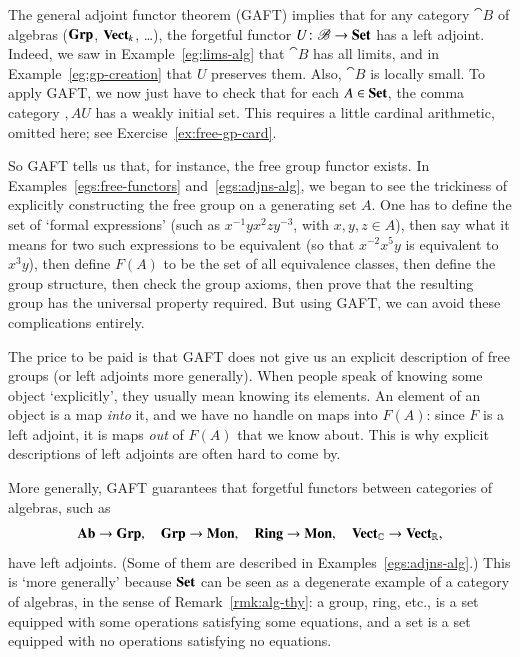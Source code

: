\begin{example}
\label{eg:gaft-free-alg}
The general adjoint functor theorem (GAFT) implies that for any category
$\cat{B}$ of algebras ($\mathbf{Grp}$, $\mathbf{Vect}_k$, \ldots), the forgetful%
%
%
functor $U\from \cat{B} \to \Set$ has a left adjoint.  Indeed, we saw in
Example~\ref{eg:lims-alg} that $\cat{B}$ has all limits, and in
Example~\ref{eg:gp-creation} that $U$ preserves them.  Also, $\cat{B}$ is
locally small.  To apply GAFT, we now just have to check that for each $A
\in \mathbf{Set}$, the comma category $\comma{A}{U}$ has a weakly initial set.
This requires a little cardinal%
%
%
%
arithmetic, omitted here; see Exercise~\ref{ex:free-gp-card}.

So GAFT tells us that, for instance, the free group%
%
%
functor exists.  In Examples~\ref{egs:free-functors}
and~\ref{egs:adjns-alg}, we began to see the
trickiness of explicitly constructing the free group on a generating set
$A$.  One has to define the set of `formal expressions' (such as $x^{-1} y
x^2 z y^{-3}$, with $x, y, z \in A$), then say what it means for two such
expressions to be equivalent (so that $x^{-2} x^5 y$ is equivalent to $x^3
y$), then define $F(A)$ to be the set of all equivalence classes, then
define the group structure, then check the group axioms, then prove that
the resulting group has the universal property required.  But using GAFT,
we can avoid these complications entirely.

The price to be paid is that GAFT does not give us an explicit%
%
%
description of free groups (or left adjoints more generally).  When people
speak of knowing some object `explicitly', they usually mean knowing its
elements.  An element of an object is a map \emph{into} it, and we have no
handle on maps into $F(A)$: since $F$ is a left adjoint, it is maps
\emph{out} of $F(A)$ that we know about.  This is why explicit descriptions
of left adjoints are often hard to come by.
\end{example}

\begin{example}
More generally, GAFT guarantees that forgetful%
%
%
functors between categories of algebras, such as
\[
\mathbf{Ab} \to \mathbf{Grp},
\quad
\mathbf{Grp} \to \mathbf{Mon},
\quad
\mathbf{Ring} \to \mathbf{Mon},
\quad
\mathbf{Vect}_{\mathbb{C}} \to \mathbf{Vect}_{\mathbb{R}},
\]
have left adjoints.  (Some of them are described in
Examples~\ref{egs:adjns-alg}.)  This is `more generally' because $\mathbf{Set}$ can
be seen as a degenerate example of a category of algebras, in the sense of
Remark~\ref{rmk:alg-thy}: a group, ring, etc., is a set equipped with some
operations satisfying some equations, and a set is a set equipped with no
operations satisfying no equations.
\end{example}

